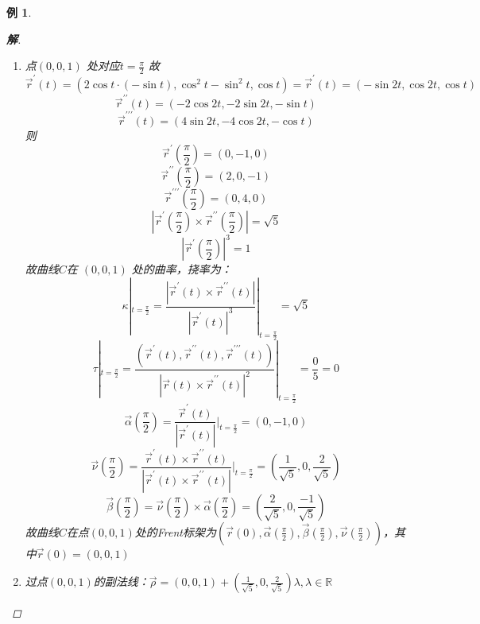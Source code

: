 \documentclass{article}                     %
\numberwithin{equation}{section}            %
\numberwithin{figure}{section}              %
\numberwithin{table}{section}               %
\newtheorem{example}{\indent 例}[section]
\newenvironment{solution}{\begin{proof}[\indent\bf 解]}{\end{proof}}
\begin{document}
\begin{example}
\begin{solution}
\begin{enumerate}
            \item 点$(0,0,1)$ 处对应$t=\frac{\pi}{2}$ 故
            $$\vec{r}^{\prime}(t)=(2\cos{t}\cdot (-\sin{t}),\cos^2{t}-\sin^2{t},\cos{t})=\vec{r}^{\prime}(t)=(-\sin{2t},\cos{2t},\cos{t})$$
            $$\vec{r}^{\prime \prime }(t)=(-2\cos{2t},-2\sin{2t},-\sin{t})$$
            $$\vec{r}^{\prime \prime\prime }(t)=(4\sin{2t},-4\cos{2t},-\cos{t})$$
            则
            $$\vec{r}^{\prime}(\frac{\pi}{2})=(0,-1,0)$$
            $$\vec{r}^{\prime \prime }(\frac{\pi}{2})=(2,0,-1)$$
            $$\vec{r}^{\prime \prime\prime }(\frac{\pi}{2})=(0,4,0)$$
            $$|\vec{r}^{\prime}(\frac{\pi}{2})\times \vec{r}^{\prime \prime }(\frac{\pi}{2})|=\sqrt{5}$$
            $$|\vec{r}^{\prime}(\frac{\pi}{2})|^{3}=1$$
            故曲线$C$在 $(0,0,1)$ 处的曲率，挠率为：
            \begin{equation*}
                \kappa |_{t=\frac{\pi}{2}} =\frac{|\vec{r}^{\prime}(t)\times \vec{r}^{\prime \prime }(t)|}{|\vec{r}^{\prime}(t)|^{3}}|_{t=\frac{\pi}{2}} =\sqrt{5} 
            \end{equation*}
            \begin{equation*}
                \tau |_{t=\frac{\pi}{2}}  =\frac{(\vec{r}^{\prime}(t),\vec{r}^{\prime \prime}(t),\vec{r}^{\prime \prime\prime }(t))}{|\vec{r}(t)\times \vec{r}^{\prime \prime}(t)|^{2}}|_{t=\frac{\pi}{2}} =\frac{0}{5}=0
            \end{equation*}
            $$\vec{\alpha }(\frac{\pi}{2})=\frac{\vec{r}^{\prime}(t)}{|\vec{r}^{\prime}(t)|}|_{t=\frac{\pi}{2}}=(0,-1,0)$$
            $$\vec{\nu}(\frac{\pi}{2})=\frac{\vec{r}^{\prime}(t)\times \vec{r}^{\prime \prime }(t)}{|\vec{r}^{\prime}(t)\times \vec{r}^{\prime \prime }(t)|}|_{t=\frac{\pi}{2}}=(\frac{1}{\sqrt{5}},0,\frac{2}{\sqrt{5}}) $$
            $$\vec{\beta }(\frac{\pi}{2})=\vec{\nu}(\frac{\pi}{2})\times \vec{\alpha }(\frac{\pi}{2})=(\frac{2}{\sqrt{5}},0,\frac{-1}{\sqrt{5}})$$
            故曲线$C$在点$(0,0,1)$处的Frent标架为$(\vec{r}(0),\vec{\alpha }(\frac{\pi}{2}),\vec{\beta }(\frac{\pi}{2}),\vec{\nu}(\frac{\pi}{2}))$，其中$\vec{r}(0)=(0,0,1)$

            \item 过点$(0,0,1)$的副法线：$\vec{\rho }=(0,0,1)+(\frac{1}{\sqrt{5}},0,\frac{2}{\sqrt{5}})\lambda ,\lambda \in \mathbb{R} $
            

\end{enumerate}
\end{solution}
\end{example}
\end{document}
